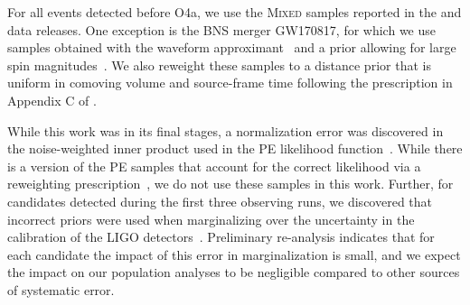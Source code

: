 For all events detected before \ac{O4a}, we use the \textsc{Mixed} samples reported 
in the \gwtcthree \citep{KAGRA:2021vkt} and \gwtctwopone \citep{LIGOScientific:2021usb} data releases. 
One exception is the \ac{BNS} merger GW170817, for which we use samples obtained with the \IMRPhenomPTWONRTidal{} waveform approximant~\citep{Dietrich:2019kaq}  and a prior allowing for  large spin magnitudes~\citep{LIGOScientific:2018hze}.
We also reweight these samples to a distance prior that is uniform in comoving volume and source-frame time
following the prescription in Appendix C of \citet{LIGOScientific:2020ibl}.

While this work was in its final stages, a normalization error was discovered in the noise-weighted inner product used in the \ac{PE} likelihood function~\citep{GWTC:Methods, Talbot:2025vth}. While there is a version of the \ac{PE} samples that account for the correct likelihood via a reweighting prescription~\citep{GWTC:Methods, Talbot:2025vth}, we do not use these samples in this work. Further, for candidates detected during the first three observing runs, we discovered that incorrect priors were used when marginalizing over the uncertainty in the calibration of the LIGO detectors~\citep{GWTC:Methods}. Preliminary re-analysis indicates that for each candidate the impact of this error in marginalization is small, and we expect the impact on our population analyses to be negligible compared to other sources of systematic error.
